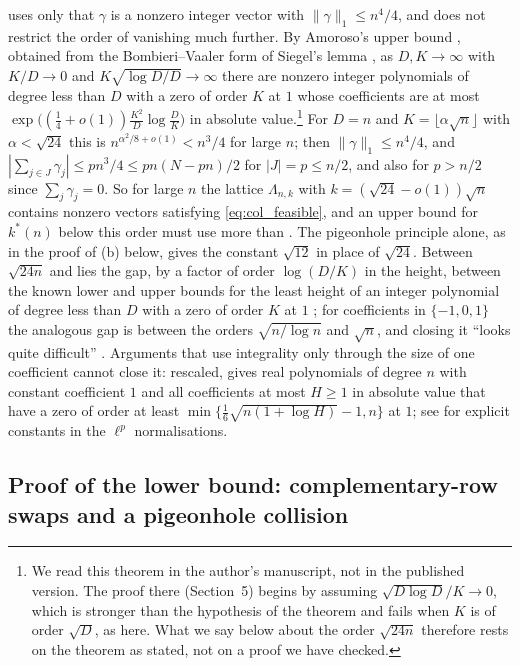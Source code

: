  uses only that $\gamma$ is a nonzero integer vector with $\|\gamma\|_1\le n^4/4$, and  does not restrict the order of vanishing much further.
By Amoroso's upper bound \cite[Thm.~2]{amoroso1995}, obtained from the Bombieri--Vaaler form of Siegel's lemma \cite{bombieri1987low}, as $D,K\to\infty$ with $K/D\to0$ and $K\sqrt{\log D/D}\to\infty$ there are nonzero integer polynomials of degree less than $D$ with a zero of order $K$ at $1$ whose coefficients are at most $\exp\bigl((\frac14+o(1))\frac{K^2}D\log\frac DK\bigr)$ in absolute value.\footnote{We read this theorem in the author's manuscript, not in the published version. The proof there (Section~5) begins by assuming $\sqrt{D\log D}/K\to0$, which is stronger than the hypothesis of the theorem and fails when $K$ is of order $\sqrt D$, as here. What we say below about the order $\sqrt{24n}$ therefore rests on the theorem as stated, not on a proof we have checked.}
For $D=n$ and $K=\lfloor\alpha\sqrt n\rfloor$ with $\alpha<\sqrt{24}$ this is $n^{\alpha^2/8+o(1)}<n^3/4$ for large $n$; then $\|\gamma\|_1\le n^4/4$, and $|\sum_{j\in J}\gamma_j|\le pn^3/4\le pn(N-pn)/2$ for $|J|=p\le n/2$, and also for $p>n/2$ since $\sum_j\gamma_j=0$.
So for large $n$ the lattice $\Lambda_{n,k}$ with $k=(\sqrt{24}-o(1))\sqrt n$ contains nonzero vectors satisfying \eqref{eq:col_feasible}, and an upper bound for $k^*(n)$ below this order must use more than .
The pigeonhole principle alone, as in the proof of (b) below, gives the constant $\sqrt{12}$ in place of $\sqrt{24}$.
Between $\sqrt{24n}$ and  lies the gap, by a factor of order $\log(D/K)$ in the height, between the known lower and upper bounds for the least height of an integer polynomial of degree less than $D$ with a zero of order $K$ at $1$ \cite{mignotte1982,bombieri1987low,amoroso1995}; for coefficients in $\{-1,0,1\}$ the analogous gap is between the orders $\sqrt{n/\log n}$ and $\sqrt n$, and closing it ``looks quite difficult'' \cite[Sect.~2]{BEK1999}.
Arguments that use integrality only through the size of one coefficient cannot close it: rescaled, \cite[Thm.~2.3]{BEK1999} gives real polynomials of degree $n$ with constant coefficient $1$ and all coefficients at most $H\ge1$ in absolute value that have a zero of order at least $\min\{\frac16\sqrt{n(1+\log H)}-1,n\}$ at $1$; see \cite[Thms.~2.1 and 2.2]{erdelyi2016} for explicit constants in the $\ell^p$ normalisations.

\subsection{Proof of the lower bound: complementary-row swaps and a pigeonhole collision}
\label{sec:kstar_lower}

